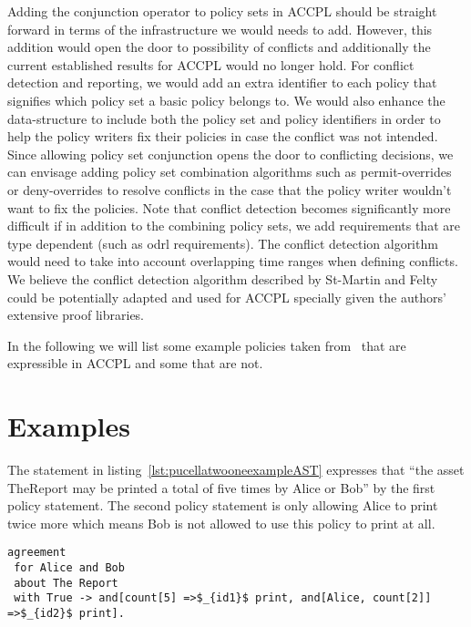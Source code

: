 Adding the conjunction operator to policy sets in \ac{ACCPL} should be straight forward in terms of the infrastructure we would needs to add. However, this addition would open the door to possibility of conflicts and additionally the current established results for \ac{ACCPL} would no longer hold. For conflict detection and reporting, we would add an extra identifier to each policy that signifies which policy set a basic policy belongs to. We would also enhance the  data-structure to include both the policy set and policy identifiers in order to help the policy writers fix their policies in case the conflict was not intended. Since allowing policy set conjunction opens the door to conflicting decisions, we can envisage adding policy set combination algorithms such as permit-overrides or deny-overrides to resolve conflicts in the case that the policy writer wouldn't want to fix the policies. Note that conflict detection becomes significantly more difficult if in addition to the combining policy sets, we add requirements that are type dependent (such as \ac{odrl} requirements). The conflict detection algorithm would need to take into account overlapping time ranges when defining conflicts. We believe the conflict detection algorithm described by St-Martin and Felty~\cite{felty16} could be potentially adapted and used for \ac{ACCPL} specially given the authors' extensive proof libraries. 

In the following we will list some example policies taken from~\cite{pucella2006} that are expressible in \ac{ACCPL} and some that are not. 

\section{Examples}

The statement in listing~\ref{lst:pucellatwooneexampleAST} expresses that ``the asset TheReport may be printed a total of five times by Alice or Bob'' by the first policy statement. The second policy statement is only allowing Alice to print twice more which means Bob is not allowed to use this policy to print at all. 

\lstset{language=Pucella2006}
\begin{minipage}[c]{0.95\textwidth}
\begin{lstlisting}[frame=single, caption={Agreement of Example 2.1}, label={lst:pucellatwooneexampleAST}, mathescape]
agreement
 for Alice and Bob 
 about The Report 
 with True -> and[count[5] =>$_{id1}$ print, and[Alice, count[2]] =>$_{id2}$ print].
\end{lstlisting}
\end{minipage} 

